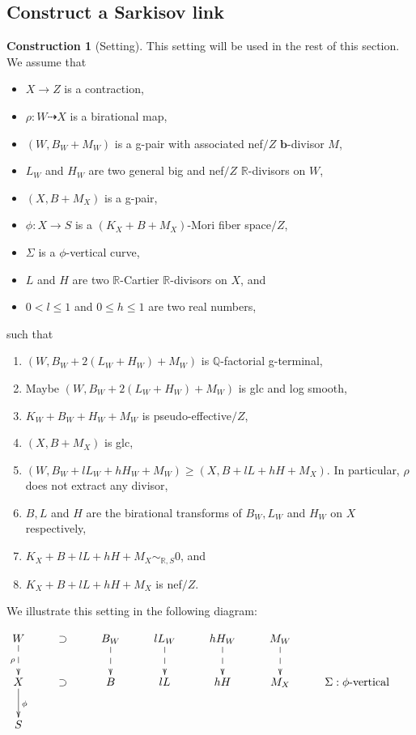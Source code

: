 \documentclass[11pt]{amsart}
\numberwithin{equation}{section}
\newcommand{\bb}{\bm{b}}
\newcommand{\Qq}{\mathbb{Q}}
\newcommand{\Rr}{\mathbb{R}}
\theoremstyle{definition}
\theoremstyle{definition}
\newtheorem{cons}[thm]{Construction}
\theoremstyle{definition}
\begin{document}
\subsection{Construct a Sarkisov link}

\begin{cons}[Setting]\label{cons: setting for sarkisov link}
This setting will be used in the rest of this section. We assume that
\begin{itemize}
    \item $X\rightarrow Z$ is a contraction,
    \item $\rho: W\dashrightarrow X$ is a birational map,
    \item $(W,B_W+M_W)$ is a g-pair with associated nef$/Z$ $\bb$-divisor $M$,
    \item $L_W$ and $H_W$ are two general big and nef$/Z$ $\Rr$-divisors on $W$, 
    \item $(X,B+M_X)$ is a g-pair, 
    \item $\phi: X\rightarrow S$ is a $(K_X+B+M_X)$-Mori fiber space$/Z$,
    \item $\Sigma$ is a $\phi$-vertical curve,
    \item $L$ and $H$ are two $\Rr$-Cartier $\Rr$-divisors on $X$, and
    \item $0<l\leq 1$ and $0\leq h\leq 1$ are two real numbers,
\end{itemize} 
such that
\begin{enumerate}
    \item $(W,B_W+2(L_W+H_W)+M_W)$ is $\Qq$-factorial g-terminal, 
    \item Maybe $(W,B_W+2(L_W+H_W)+M_W)$ is glc and log smooth, 
    \item $K_W+B_W+H_W+M_W$ is pseudo-effective$/Z$,
    \item $(X,B+M_X)$ is glc,
    \item $(W,B_W+lL_W+hH_W+M_W)\geq (X,B+lL+hH+M_X)$. In particular, $\rho$ does not extract any divisor,
    \item $B,L$ and $H$ are the birational transforms of $B_W,L_W$ and $H_W$ on $X$ respectively,
    \item $K_X+B+lL+hH+M_X\sim_{\mathbb R,S}0$, and
    \item $K_X+B+lL+hH+M_X$ is nef$/Z$.
\end{enumerate}
We illustrate this setting in the following diagram:
\medskip

\begin{center}$\xymatrix{
  W\ar@{-->}[d]_{\rho}&\supset & B_W\ar@{-->}[d] &lL_W\ar@{-->}[d] &hH_W\ar@{-->}[d] &M_W\ar@{-->}[d] &\\
      X \ar@{->}[d]^{\phi}&\supset & B &lL &hH &M_X  &\Sigma:\phi\text{-vertical}    \\
    S & }$
\end{center}
\end{cons}
\end{document}
